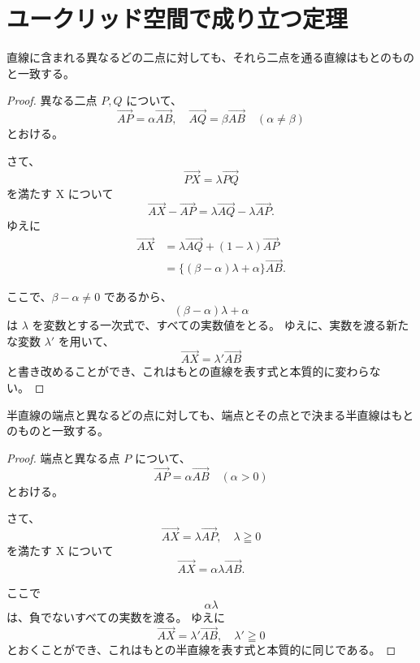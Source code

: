\chapter{ユークリッド空間で成り立つ定理}

\begin{thm}\label{251101142501}
  直線に含まれる異なるどの二点に対しても、それら二点を通る直線はもとのものと一致する。
\end{thm}

\begin{proof}
  異なる二点 \(P,Q\) について、
  \[\overrightarrow{AP}=\alpha\overrightarrow{AB},\quad \overrightarrow{AQ}=\beta\overrightarrow{AB} \quad (\alpha\neq\beta)\]
  とおける。

  さて、
  \[\overrightarrow{PX}=\lambda\overrightarrow{PQ}\]
  を満たす X について
  \[\overrightarrow{AX}-\overrightarrow{AP}=\lambda\overrightarrow{AQ}-\lambda\overrightarrow{AP}.\]
  ゆえに
  \begin{align*}
    \overrightarrow{AX} &= \lambda\overrightarrow{AQ}+(1-\lambda)\overrightarrow{AP} \\
                        &= \{(\beta-\alpha)\lambda+\alpha\}\overrightarrow{AB}.
  \end{align*}

  ここで、\(\beta-\alpha\neq0\) であるから、
  \[(\beta-\alpha)\lambda+\alpha\]
  は \(\lambda\) を変数とする一次式で、すべての実数値をとる。
  ゆえに、実数を渡る新たな変数 \(\lambda'\) を用いて、
  \[\overrightarrow{AX}=\lambda'\overrightarrow{AB}\]
  と書き改めることができ、これはもとの直線を表す式と本質的に変わらない。
\end{proof}

\begin{thm}\label{251101142302}
  半直線の端点と異なるどの点に対しても、端点とその点とで決まる半直線はもとのものと一致する。
\end{thm}

\begin{proof}
  端点と異なる点 \(P\) について、
  \[\overrightarrow{AP}=\alpha\overrightarrow{AB} \quad (\alpha>0)\]
  とおける。

  さて、
  \[\overrightarrow{AX}=\lambda\overrightarrow{AP},\quad \lambda\geqq0\]
  を満たす X について
  \[\overrightarrow{AX}=\alpha\lambda\overrightarrow{AB}.\]

  ここで
  \[\alpha\lambda\]
  は、負でないすべての実数を渡る。
  ゆえに
  \[\overrightarrow{AX}=\lambda'\overrightarrow{AB},\quad \lambda'\geqq0\]
  とおくことができ、これはもとの半直線を表す式と本質的に同じである。
\end{proof}

